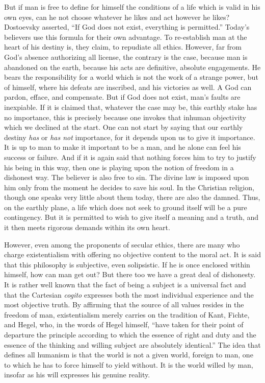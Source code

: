 \documentclass[11pt]{article}
\begin{document}
But if man is free to define for himself the conditions of a life which is valid in his own eyes, can he not choose whatever he likes and act however he likes? Dostoevsky asserted, “If God does not exist, everything is permitted.” Today’s believers use this formula for their own advantage. To re-establish man at the heart of his destiny is, they claim, to repudiate all ethics. However, far from God’s absence authorizing all license, the contrary is the case, because man is abandoned on the earth, because his acts are definitive, absolute engagements. He bears the responsibility for a world which is not the work of a strange power, but of himself, where his defeats are inscribed, and his victories as well. A God can pardon, efface, and compensate. But if God does not exist, man’s faults are inexpiable. If it is claimed that, whatever the case may be, this earthly stake has no importance, this is precisely because one invokes that inhuman objectivity which we declined at the start. One can not start by saying that our earthly destiny \textit{has} or \textit{has not} importance, for it depends upon us to give it importance. It is up to man to make it important to be a man, and he alone can feel his success or failure. And if it is again said that nothing forces him to try to justify his being in this way, then one is playing upon the notion of freedom in a dishonest way. The believer is also free to sin. The divine law is imposed upon him only from the moment he decides to save his soul. In the Christian religion, though one speaks very little about them today, there are also the damned. Thus, on the earthly plane, a life which does not seek to ground itself will be a pure contingency. But it is permitted to wish to give itself a meaning and a truth, and it then meets rigorous demands within its own heart.

However, even among the proponents of secular ethics, there are many who charge existentialism with offering no objective content to the moral act. It is said that this philosophy is subjective, even solipsistic. If he is once enclosed within himself, how can man get out? But there too we have a great deal of dishonesty. It is rather well known that the fact of being a subject is a universal fact and that the Cartesian \textit{cogito} expresses both the most individual experience and the most objective truth. By affirming that the source of all values resides in the freedom of man, existentialism merely carries on the tradition of Kant, Fichte, and Hegel, who, in the words of Hegel himself, “have taken for their point of departure the principle according to which the essence of right and duty and the essence of the thinking and willing subject are absolutely identical.” The idea that defines all humanism is that the world is not a given world, foreign to man, one to which he has to force himself to yield without. It is the world willed by man, insofar as his will expresses his genuine reality.
\end{document}
